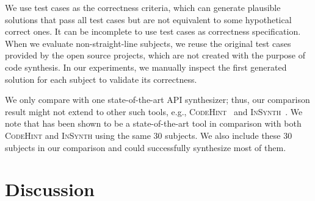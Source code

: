   We use  test cases as the
correctness criteria, which can generate plausible solutions that pass
all test cases but are not equivalent to some hypothetical correct
ones.  It can be incomplete to use test cases as correctness
specification.  When we evaluate non-straight-line subjects, we reuse
the original test cases provided by the open source projects, which
are not created with the purpose of code synthesis. In
our experiments, we manually inspect the first generated solution for
each subject to validate its correctness. %

We only compare \tool with one state-of-the-art API synthesizer; thus,
our comparison result might not extend to other such tools, e.g.,
\textsc{CodeHint}~\cite{codehint:icse14} and
\textsc{InSynth}~\cite{insynth:cav11}.  We note that \spt has been
shown to be a state-of-the-art tool in comparison with both
\textsc{CodeHint} and \textsc{InSynth} using the same 30 subjects.  We
also include these 30 subjects in our comparison and \tool could
successfully synthesize most of them. 



  \vspace{-2mm}
\section{Discussion}~\label{sec:discuss}
  \vspace{-2mm}
  
